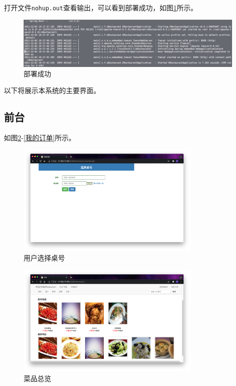 \documentclass[11pt]{homework}
\begin{document}
  打开文件\verb|nohup.out|查看输出，可以看到部署成功，如图\ref{部署成功}所示。
  \begin{figure}[htb]
    \centering
    \includegraphics[width=\textwidth]{部署成功}
    \caption{部署成功}
    \label{部署成功}
  \end{figure}

  以下将展示本系统的主要界面。

  \subsection*{前台}

  如图\ref{用户选择桌号}-\ref{我的订单}所示。

    \begin{figure}[h]
      \centering
      \includegraphics[width=0.8\textwidth]{用户选择桌号}
      \caption{用户选择桌号}
      \label{用户选择桌号}
    \end{figure}

    \begin{figure}[h]
      \centering
      \includegraphics[width=0.8\textwidth]{菜品总览}
      \caption{菜品总览}
      \label{菜品总览}
    \end{figure}
\end{document}
